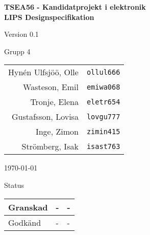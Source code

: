 \documentclass[11pt]{article}
\begin{document}
\begin{titlepage}
\begin{center}

{\Large\bfseries TSEA56 - Kandidatprojekt i elektronik \\ LIPS Designspecifikation}

\vspace{5em}

Version 0.1

\vspace{5em}
Grupp 4 \\
\begin{tabular}{rl}
Hynén Ulfsjöö, Olle&\verb+ollul666+
\\
Wasteson, Emil&\verb+emiwa068+
\\
Tronje, Elena&\verb+eletr654+
\\
Gustafsson, Lovisa&\verb+lovgu777+
\\
Inge, Zimon&\verb+zimin415+
\\
Strömberg, Isak&\verb+isast763+
\\
\end{tabular}

\vspace{5em}
\today

\vspace{16em}
Status
\begin{longtable}{|l|l|l|} \hline

Granskad & - & - \\ \hline
Godkänd & - & - \\ \hline
 
\end{longtable}

\end{center}
\end{titlepage}
\end{document}
